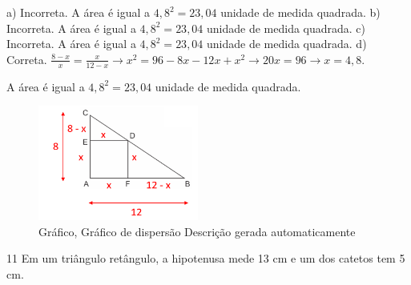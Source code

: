 \begin{escolha}
\begin{boxmedio}
\begin{boxmedio}
{\begin{boxpeq}
\begin{boxpeq}
{\begin{boxpeq}
\begin{boxmedio}
\begin{boxmedio}
\begin{boxpeq}
\begin{boxmedio}
\begin{boxpeq}
\begin{boxpeq}
\begin{boxpeq}
\begin{boxpeq}
\begin{boxmedio}
{\begin{boxmedio}
\begin{boxmedio}
\begin{boxpeq}
\begin{boxmedio}
\begin{boxpeq}
\begin{boxpeq}
\begin{boxpeq}
\begin{escolha}
{\begin{boxmedio}
\begin{boxpeq}
\begin{boxpeq}
\begin{boxpeq}
\begin{boxpeq}
\begin{boxpeq}
\begin{boxmedio}
\begin{boxpeq}
\begin{boxpeq}
\begin{boxpeq}
{\begin{boxpeq}
\begin{boxmedio}
\begin{boxpeq}
\begin{boxpeq}
\begin{boxpeq}
{\begin{boxpeq}
\begin{boxmedio}
{\begin{boxpeq}
\begin{boxpeq}
\begin{boxmedio}
\begin{boxmedio}
\begin{boxpeq}
\begin{boxpeq}
{\begin{boxpeq}
\begin{boxpeq}
\begin{boxpeq}
\begin{boxpeq}
\begin{boxpeq}
\begin{escolha}
\begin{escolha}
{\begin{boxmedio}
\begin{boxpeq}
\begin{q°}
\begin{boxmedio}
\begin{boxpeq}
\begin{boxpeq}
\begin{boxmedio}
\begin{boxmedio}
\begin{boxmedio}
\begin{boxmedio}
{\begin{escolha}
\begin{escolha}
\begin{escolha}
\begin{escolha}
\begin{escolha}
\begin{escolha}
{a) Incorreta. A área é igual a $4,8^2 = 23,04$ unidade de medida quadrada.
b) Incorreta. A área é igual a $4,8^2 = 23,04$ unidade de medida quadrada. 
c) Incorreta. A área é igual a $4,8^2 = 23,04$ unidade de medida quadrada. 
d) Correta. $\frac{8 - x}{x} = \frac{x}{12 - x} \rightarrow x^{2} = 96 - 8x - 12x + x^2 \rightarrow 20x = 96 \rightarrow x = 4,8$.

A área é igual a $4,8^2 = 23,04$ unidade de medida quadrada.

\begin{figure}
\centering
\includegraphics[width=2.07292in,height=1.48748in]{./_SAEB_9_MAT/media/image268.png}
\caption{Gráfico, Gráfico de dispersão Descrição gerada automaticamente}
\end{figure}
}

\num{11} Em um triângulo retângulo, a hipotenusa mede 13 cm e um
dos catetos tem 5 cm.


\end{escolha}
\end{escolha}
\end{escolha}
\end{escolha}
\end{escolha}
\end{escolha}}
\end{boxmedio}
\end{boxmedio}
\end{boxmedio}
\end{boxmedio}
\end{boxpeq}
\end{boxpeq}
\end{boxmedio}
\end{q°}
\end{boxpeq}
\end{boxmedio}}
\end{escolha}
\end{escolha}
\end{boxpeq}
\end{boxpeq}
\end{boxpeq}
\end{boxpeq}
\end{boxpeq}}
\end{boxpeq}
\end{boxpeq}
\end{boxmedio}
\end{boxmedio}
\end{boxpeq}
\end{boxpeq}}
\end{boxmedio}
\end{boxpeq}}
\end{boxpeq}
\end{boxpeq}
\end{boxpeq}
\end{boxmedio}
\end{boxpeq}}
\end{boxpeq}
\end{boxpeq}
\end{boxpeq}
\end{boxmedio}
\end{boxpeq}
\end{boxpeq}
\end{boxpeq}
\end{boxpeq}
\end{boxpeq}
\end{boxmedio}}
\end{escolha}
\end{boxpeq}
\end{boxpeq}
\end{boxpeq}
\end{boxmedio}
\end{boxpeq}
\end{boxmedio}
\end{boxmedio}}
\end{boxmedio}
\end{boxpeq}
\end{boxpeq}
\end{boxpeq}
\end{boxpeq}
\end{boxmedio}
\end{boxpeq}
\end{boxmedio}
\end{boxmedio}
\end{boxpeq}}
\end{boxpeq}
\end{boxpeq}}
\end{boxmedio}
\end{boxmedio}
\end{escolha}
